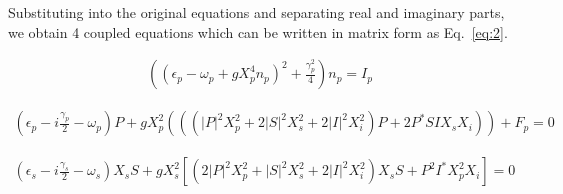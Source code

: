 \documentclass[a4paper,prb,10pt,aps,twocolumn]{revtex4-1}
\begin{document}

Substituting into the original equations and separating real and imaginary parts, we obtain 4 coupled equations which can be written in matrix form as Eq.~\eqref{eq:2}.

\begin{multline}
  \label{eq:19}
\left(\left(\epsilon_{p}-\omega_{p}+gX_{p}^{4}n_{p}\right)^{2}+\frac{\gamma_{p}^{2}}{4}\right)n_{p}=I_{p}  
\end{multline}

\begin{multline}
  \label{eq:20}
\left(\epsilon_{p}-i\frac{\gamma_{p}}{2}-\omega_{p}\right)P+gX_{p}^{2}\left(\left(\left(|P|^{2}X_{p}^{2}+2|S|^{2}X_{s}^{2}+2|I|^{2}X_{i}^{2}\right)P+2P^{*}SIX_{s}X_{i}\right)\right)+F_{p}=0  
\end{multline}

\begin{multline}
  \label{eq:21}
\left(\epsilon_{s}-i\frac{\gamma_{s}}{2}-\omega_{s}\right)X_{s}S+gX_{s}^{2}\left[\left(2|P|^{2}X_{p}^{2}+|S|^{2}X_{s}^{2}+2|I|^{2}X_{i}^{2}\right)X_{s}S+P^{2}I^{*}X_{p}^{2}X_{i}\right]=0  
\end{multline}
\end{document}
